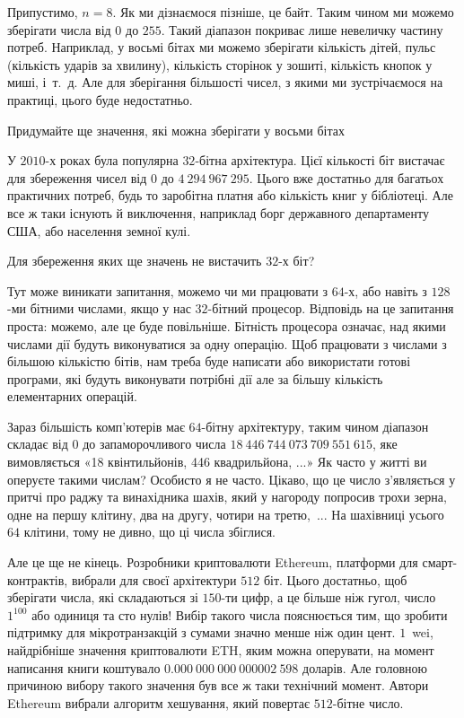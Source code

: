\documentclass{book}
\begin{document}
Припустимо, $n=8$. Як ми дізнаємося пізніше, це байт.
Таким чином ми можемо зберігати числа від $0$ до $255$.
Такий діапазон покриває лише невеличку частину потреб.
Наприклад, у восьмі бітах ми можемо зберігати кількість дітей, пульс (кількість ударів за хвилину), кількість сторінок у зошиті, кількість кнопок у миші, і~т.~д.
Але для зберігання більшості чисел, з якими ми зустрічаємося на практиці, цього буде недостатньо.

\begin{exercise}
Придумайте ще значення, які можна зберігати у восьми бітах
\end{exercise}

У $2010$-х роках була популярна $32$-бітна архітектура.
Цієї кількості біт вистачає для збереження чисел від $0$ до $4~294~967~295$.
Цього вже достатньо для багатьох практичних потреб, будь то заробітна платня або кількість книг у бібліотеці.
Але все ж таки існують й виключення, наприклад борг державного департаменту США, або населення земної кулі.

\begin{exercise}
Для збереження яких ще значень не вистачить $32$-х біт?
\end{exercise}

Тут може виникати запитання, можемо чи ми працювати з $64$-х, або навіть з $128$-ми бітними числами, якщо у нас $32$-бітний процесор.
Відповідь на це запитання проста: можемо, але це буде повільніше.
Бітність процесора означає, над якими числами дії будуть виконуватися за одну операцію.
Щоб працювати з числами з більшою кількістю бітів, нам треба буде написати або використати готові програми, які будуть виконувати потрібні дії але за більшу кількість елементарних операцій.

Зараз більшість комп'ютерів має $64$-бітну архітектуру, таким чином діапазон складає від $0$ до запаморочливого числа $18~446~744~073~709~551~615$, яке вимовляється «18 квінтильйонів, 446 квадрильйона, ...»
Як часто у житті ви оперуєте такими числам? Особисто я не часто.
Цікаво, що це число з'являється у притчі про раджу та винахідника шахів, який у нагороду попросив трохи зерна, одне на першу клітину, два на другу, чотири на третю,~...
На шахівниці усього $64$ клітини, тому  не дивно, що ці числа збіглися.

Але це ще не кінець.
Розробники криптовалюти Ethereum, платформи для смарт-контрактів, вибрали для своєї архітектури $512$ біт.
Цього достатньо, щоб зберігати числа, які складаються зі $150$-ти цифр, а це більше ніж гугол, число $1^{100}$ або одиниця та сто нулів!
Вибір такого числа пояснюється тим, що зробити підтримку для мікротранзакцій з сумами значно менше ніж один цент.
$1$~wei, найдрібніше значення криптовалюти ETH, яким можна оперувати, на момент написання книги коштувало $0.000~000~000~000 002~598$ доларів.
Але головною причиною вибору такого значення був все ж таки технічний момент.
Автори Ethereum вибрали алгоритм хешування, який повертає $512$-бітне число.
\end{document}
